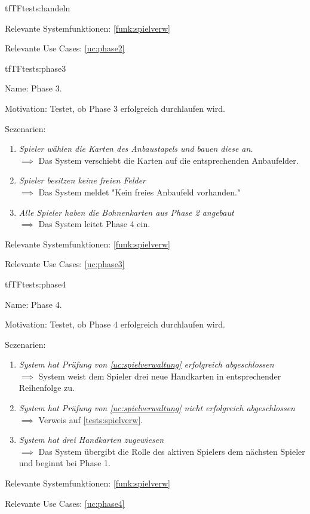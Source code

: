\begin{description}[leftmargin=5em, style=sameline]
\begin{lhp}{tf}{TF}{tests:handeln}
\begin{enumerate}
	\end{enumerate}
	\item [Relevante Systemfunktionen:] \ref{funk:spielverw}
	\item [Relevante Use Cases:] \ref{uc:phase2}
\end{lhp}

\begin{lhp}{tf}{TF}{tests:phase3}
	\item [Name:] Phase 3.
	\item [Motivation:] Testet, ob Phase 3 erfolgreich durchlaufen wird.
	\item [Sczenarien:] \hfill
	\begin{enumerate}
		\item \textit{Spieler wählen die Karten des Anbaustapels und bauen diese an.} \\ $\implies$ Das System verschiebt die Karten auf die entsprechenden Anbaufelder.
		\item \textit{Spieler besitzen keine freien Felder} \\ $\implies$ Das System meldet "{}Kein freies Anbaufeld vorhanden."{}
		\item \textit{Alle Spieler haben die Bohnenkarten aus Phase 2 angebaut} \\ $\implies$ Das System leitet Phase 4 ein.
		
	\end{enumerate}
	\item [Relevante Systemfunktionen:] \ref{funk:spielverw}
	\item [Relevante Use Cases:] \ref{uc:phase3}
\end{lhp}

\begin{lhp}{tf}{TF}{tests:phase4}
	\item [Name:] Phase 4.
	\item [Motivation:] Testet, ob Phase 4 erfolgreich durchlaufen wird.
	\item [Sczenarien:] \hfill
	\begin{enumerate}
		\item \textit{System hat Prüfung von \ref{uc:spielverwaltung} erfolgreich abgeschlossen} \\ $\implies$ System weist dem Spieler drei neue Handkarten in entsprechender Reihenfolge zu.
		\item \textit{System hat Prüfung von \ref{uc:spielverwaltung} nicht erfolgreich abgeschlossen} \\ $\implies$ Verweis auf \ref{tests:spielverw}.
		\item \textit{System hat drei Handkarten zugewiesen} \\ $\implies$ Das System übergibt die Rolle des aktiven Spielers dem nächsten Spieler und beginnt bei Phase 1.	
	\end{enumerate}
	\item [Relevante Systemfunktionen:] \ref{funk:spielverw}
	\item [Relevante Use Cases:] \ref{uc:phase4}
\end{lhp}



\end{description}